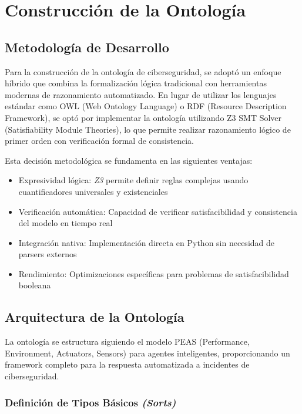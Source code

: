 \section{Construcción de la Ontología}

\subsection{Metodología de Desarrollo}

Para la construcción de la ontología de ciberseguridad, se adoptó un enfoque híbrido que combina la formalización lógica tradicional con herramientas modernas de razonamiento automatizado. En lugar de utilizar los lenguajes estándar como OWL (Web Ontology Language) o RDF (Resource Description Framework), se optó por implementar la ontología utilizando Z3 SMT Solver (Satisfiability Module Theories), lo que permite realizar razonamiento lógico de primer orden con verificación formal de consistencia.

Esta decisión metodológica se fundamenta en las siguientes ventajas:

\begin{itemize}
    \item Expresividad lógica: \textit{Z3} permite definir reglas complejas usando cuantificadores universales y existenciales
    
    \item Verificación automática: Capacidad de verificar satisfacibilidad y consistencia del modelo en tiempo real
    
    \item Integración nativa: Implementación directa en Python sin necesidad de parsers externos 
    
    \item Rendimiento: Optimizaciones específicas para problemas de satisfacibilidad booleana 
\end{itemize}

\subsection{Arquitectura de la Ontología}

La ontología se estructura siguiendo el modelo PEAS (Performance, Environment, Actuators, Sensors) para agentes inteligentes, proporcionando un framework completo para la respuesta automatizada a incidentes de ciberseguridad.

\subsubsection{Definición de Tipos Básicos \textit{(Sorts)}}

